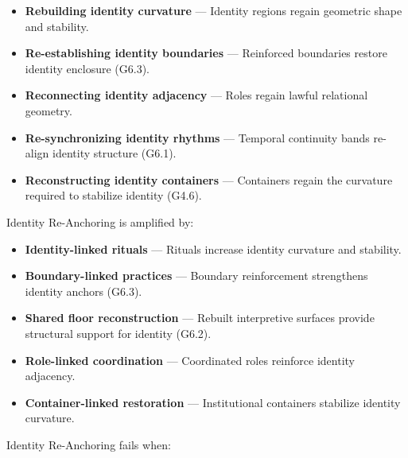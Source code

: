 \begin{itemize}[leftmargin=1.2cm]
    \item \textbf{Rebuilding identity curvature} — Identity regions regain
    geometric shape and stability.

    \item \textbf{Re-establishing identity boundaries} — Reinforced boundaries
    restore identity enclosure (G6.3).

    \item \textbf{Reconnecting identity adjacency} — Roles regain lawful
    relational geometry.

    \item \textbf{Re-synchronizing identity rhythms} — Temporal continuity bands
    re-align identity structure (G6.1).

    \item \textbf{Reconstructing identity containers} — Containers regain the
    curvature required to stabilize identity (G4.6).
\end{itemize}

\medskip

\noindent Identity Re-Anchoring is amplified by:

\begin{itemize}[leftmargin=1.2cm]
    \item \textbf{Identity-linked rituals} — Rituals increase identity curvature
    and stability.

    \item \textbf{Boundary-linked practices} — Boundary reinforcement strengthens
    identity anchors (G6.3).

    \item \textbf{Shared floor reconstruction} — Rebuilt interpretive surfaces
    provide structural support for identity (G6.2).

    \item \textbf{Role-linked coordination} — Coordinated roles reinforce
    identity adjacency.

    \item \textbf{Container-linked restoration} — Institutional containers
    stabilize identity curvature.
\end{itemize}

\medskip

\noindent Identity Re-Anchoring fails when:

